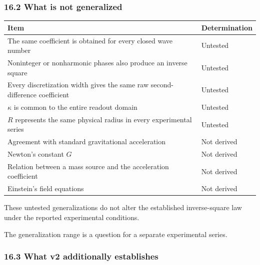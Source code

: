 \documentclass[
  a4paper,
]{article}
\newcounter{none} %
\begin{document}
\subsubsection{16.2 What is not
generalized}\label{what-is-not-generalized}

{\def\LTcaptype{none} %
\begin{longtable}[]{@{}
  >{\raggedright\arraybackslash}p{}
  >{\raggedright\arraybackslash}p{}@{}}
\toprule\noalign{}
\begin{minipage}[b]{\linewidth}\raggedright
Item
\end{minipage} & \begin{minipage}[b]{\linewidth}\raggedright
Determination
\end{minipage} \\
\midrule\noalign{}
\endhead
\bottomrule\noalign{}
\endlastfoot
The same coefficient is obtained for every closed wave number &
Untested \\
Noninteger or nonharmonic phases also produce an inverse square &
Untested \\
Every discretization width gives the same raw second-difference
coefficient & Untested \\
\(\kappa\) is common to the entire readout domain & Untested \\
\(R\) represents the same physical radius in every experimental series &
Untested \\
Agreement with standard gravitational acceleration & Not derived \\
Newton's constant \(G\) & Not derived \\
Relation between a mass source and the acceleration coefficient & Not
derived \\
Einstein's field equations & Not derived \\
\end{longtable}
}

These untested generalizations do not alter the established
inverse-square law under the reported experimental conditions.

The generalization range is a question for a separate experimental
series.

\subsubsection{16.3 What v2 additionally
establishes}\label{what-v2-additionally-establishes}
\end{document}
